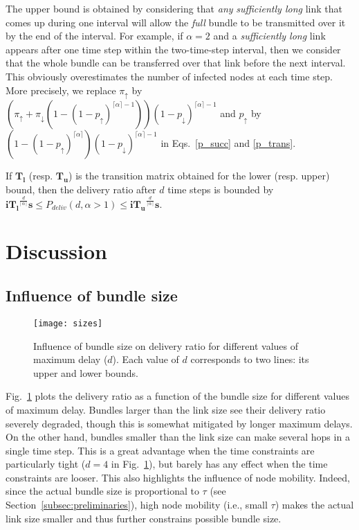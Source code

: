 \documentclass[final,journal,letterpaper]{IEEEtran}
\begin{document}
The upper bound is obtained by considering that \emph{any} \textit{sufficiently long} link that comes up during one interval will allow the \emph{full} bundle to be transmitted over it by the end of the interval. For example, if $\alpha = 2$ and a \textit{sufficiently long} link appears after one time step within the two-time-step interval, then we consider that the whole bundle can be transferred over that link before the next interval. This obviously overestimates the number of infected nodes at each time step. More precisely, we replace $\pi_\uparrow$ by $\left(\pi_\uparrow+\pi_\downarrow (1-(1-p_\uparrow)^{\lceil \alpha \rceil - 1})\right) (1-p_\downarrow)^{\lceil \alpha \rceil - 1}$ and $p_\uparrow$ by $\left(1-(1-p_\uparrow)^{\lceil \alpha \rceil}\right)(1-p_\downarrow)^{\lceil \alpha \rceil - 1}$ in Eqs.~\ref{p_succ} and \ref{p_trans}.

If $\mathbf{T_l}$ (resp. $\mathbf{T_u}$) is the transition matrix obtained for the lower (resp. upper) bound, then the delivery ratio after $d$ time steps is bounded by \mbox{$\mathbf{i} \mathbf{T_l}^{\frac{d}{\lceil \alpha \rceil}} \mathbf{s} \le P_{deliv}(d,\alpha > 1) \le \mathbf{i} \mathbf{T_u}^{\frac{d}{\lceil \alpha \rceil}} \mathbf{s}$}.


\section{Discussion}
\label{sec:discussion}

\subsection{Influence of bundle size}
\label{subsec:bundle_size}

\begin{figure}[t]
  \centering
  \texttt{[image: sizes]}
  \caption{Influence of bundle size on delivery ratio for different values of maximum delay ($d$). Each value of $d$ corresponds to two lines: its upper and lower bounds.}
  \label{param_size}
\end{figure}

Fig.~\ref{param_size} plots the delivery ratio as a function of the bundle size for different values of maximum delay. Bundles larger than the link size see their delivery ratio severely degraded, though this is somewhat mitigated by longer maximum delays. On the other hand, bundles smaller than the link size can make several hops in a single time step. This is a great advantage when the time constraints are particularly tight ($d=4$ in Fig.~\ref{param_size}), but barely has any effect when the time constraints are looser. This also highlights the influence of node mobility. Indeed, since the actual bundle size is proportional to $\tau$ (see Section~\ref{subsec:preliminaries}), high node mobility (i.e., small $\tau$) makes the actual link size smaller and thus further constrains possible bundle size.
\end{document}
